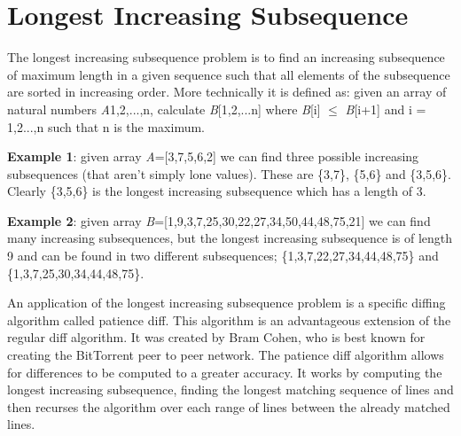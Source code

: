 \section{Longest Increasing Subsequence}
The longest increasing subsequence problem is to find an increasing subsequence of maximum length in a given sequence such that all elements of the subsequence are sorted in increasing order. More technically it is defined as: given an array of natural numbers \textit{A}{1,2,...,n}, calculate \textit{B}[1,2,...n] where \textit{B}[i] $\leq$ \textit{B}[i+1] and i = 1,2...,n such that n is the maximum.
\par\noindent
\textbf{Example 1}: given array \textit{A}=[3,7,5,6,2] we can find three possible increasing subsequences (that aren't simply lone values). These are \{3,7\}, \{5,6\} and \{3,5,6\}. Clearly \{3,5,6\} is the longest increasing subsequence which has a length of 3.
\par\noindent
\textbf{Example 2}: given array \textit{B}=[1,9,3,7,25,30,22,27,34,50,44,48,75,21] we can find many increasing subsequences, but the longest increasing subsequence is of length 9 and can be found in two different subsequences; \{1,3,7,22,27,34,44,48,75\} and \{1,3,7,25,30,34,44,48,75\}.
\par\noindent

\par\noindent
An application of the longest increasing subsequence problem is a specific diffing algorithm called patience diff. This algorithm is an advantageous extension of the regular diff algorithm. It was created by Bram Cohen, who is best known for creating the BitTorrent peer to peer network. The patience diff algorithm allows for differences to be computed to a greater accuracy. It works by computing the longest increasing subsequence, finding the longest matching sequence of lines and then recurses the algorithm over each range of lines between the already matched lines.

